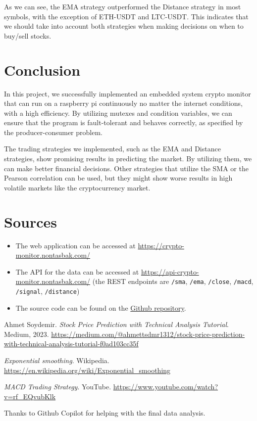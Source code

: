 \documentclass{article}
\begin{document}
As we can see, the EMA strategy outperformed the Distance strategy in most symbols, with the exception 
of ETH-USDT and LTC-USDT. This indicates that we should take into account both strategies when making
decisions on when to buy/sell stocks.

\section{Conclusion}
In this project, we successfully implemented an embedded system crypto monitor that can run on a raspberry pi
continuously no matter the internet conditions, with a high efficiency. By utilizing mutexes and condition variables,
we can ensure that the program is fault-tolerant and behaves correctly, as specified by the producer-consumer problem.

The trading strategies we implemented, such as the EMA and Distance strategies, show promising results in predicting 
the market. By utilizing them, we can make better financial decisions. Other strategies that utilize the SMA or
the Pearson correlation can be used, but they might show worse results in high volatile markets like the cryptocurrency market.

\section{Sources}
\begin{itemize}
    \item The web application can be accessed at \url{https://crypto-monitor.nontasbak.com/}
    \item The API for the data can be accessed at \url{https://api-crypto-monitor.nontasbak.com/} (the REST endpoints are \texttt{/sma}, \texttt{/ema}, \texttt{/close}, \texttt{/macd}, \texttt{/signal}, \texttt{/distance})
    \item The source code can be found on the \href{https://github.com/NontasBak/embedded-crypto-monitor}{Github repository}.
\end{itemize}

\begin{thebibliography}{9}

Ahmet Soydemir.
\textit{Stock Price Prediction with Technical Analysis Tutorial}.
Medium, 2023.
\url{https://medium.com/@ahmettsdmr1312/stock-price-prediction-with-technical-analysis-tutorial-f0ad103cc35f}

\textit{Exponential smoothing}.
Wikipedia.
\url{https://en.wikipedia.org/wiki/Exponential_smoothing}

\textit{MACD Trading Strategy}.
YouTube.
\url{https://www.youtube.com/watch?v=rf_EQvubKlk}

Thanks to Github Copilot for helping with the final data analysis.

\end{thebibliography}
\end{document}
